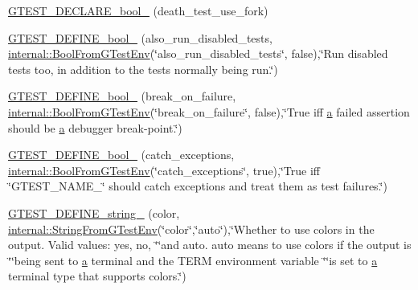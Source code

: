 \begin{DoxyCompactItemize}
\item 
\hyperlink{namespacetesting_a534f0743e7c42c55d27dcd0dd3d38f18}{G\+T\+E\+S\+T\+\_\+\+D\+E\+C\+L\+A\+R\+E\+\_\+bool\+\_\+} (death\+\_\+test\+\_\+use\+\_\+fork)
\item 
\hyperlink{namespacetesting_aaead7d1aa21cf4a222e10e4c91c21ee5}{G\+T\+E\+S\+T\+\_\+\+D\+E\+F\+I\+N\+E\+\_\+bool\+\_\+} (also\+\_\+run\+\_\+disabled\+\_\+tests, \hyperlink{namespacetesting_1_1internal_a67132cdce23fb71b6c38ee34ef81eb4c}{internal\+::\+Bool\+From\+G\+Test\+Env}(\char`\"{}also\+\_\+run\+\_\+disabled\+\_\+tests\char`\"{}, false),\char`\"{}Run disabled tests too, in addition to the tests normally being run.\char`\"{})
\item 
\hyperlink{namespacetesting_a5c9316c2f726f836c50fcfc1065d718c}{G\+T\+E\+S\+T\+\_\+\+D\+E\+F\+I\+N\+E\+\_\+bool\+\_\+} (break\+\_\+on\+\_\+failure, \hyperlink{namespacetesting_1_1internal_a67132cdce23fb71b6c38ee34ef81eb4c}{internal\+::\+Bool\+From\+G\+Test\+Env}(\char`\"{}break\+\_\+on\+\_\+failure\char`\"{}, false),\char`\"{}True iff \hyperlink{_07copy_08_2_read_camera_model_8m_a551a3d351eadcc0b9b1a2f24f0fb5ea0}{a} failed assertion should be \hyperlink{_07copy_08_2_read_camera_model_8m_a551a3d351eadcc0b9b1a2f24f0fb5ea0}{a} debugger break-\/point.\char`\"{})
\item 
\hyperlink{namespacetesting_a16f63f28356f1843888013487da9f89d}{G\+T\+E\+S\+T\+\_\+\+D\+E\+F\+I\+N\+E\+\_\+bool\+\_\+} (catch\+\_\+exceptions, \hyperlink{namespacetesting_1_1internal_a67132cdce23fb71b6c38ee34ef81eb4c}{internal\+::\+Bool\+From\+G\+Test\+Env}(\char`\"{}catch\+\_\+exceptions\char`\"{}, true),\char`\"{}True iff \char`\"{}G\+T\+E\+S\+T\+\_\+\+N\+A\+M\+E\+\_\+\char`\"{} should catch exceptions and treat them as test failures.\char`\"{})
\item 
\hyperlink{namespacetesting_a00b4a4eabdef5927208aeabd81220069}{G\+T\+E\+S\+T\+\_\+\+D\+E\+F\+I\+N\+E\+\_\+string\+\_\+} (color, \hyperlink{namespacetesting_1_1internal_ac54dabc540bf79c2de91add679bfb93b}{internal\+::\+String\+From\+G\+Test\+Env}(\char`\"{}color\char`\"{},\char`\"{}auto\char`\"{}),\char`\"{}Whether to use colors in the output.  Valid values\+: yes, no, \char`\"{}\char`\"{}and auto.  \textquotesingle{}auto\textquotesingle{} means to use colors if the output is \char`\"{}\char`\"{}being sent to \hyperlink{_07copy_08_2_read_camera_model_8m_a551a3d351eadcc0b9b1a2f24f0fb5ea0}{a} terminal and the T\+E\+RM environment variable \char`\"{}\char`\"{}is set to \hyperlink{_07copy_08_2_read_camera_model_8m_a551a3d351eadcc0b9b1a2f24f0fb5ea0}{a} terminal type that supports colors.\char`\"{})

\end{DoxyCompactItemize}
